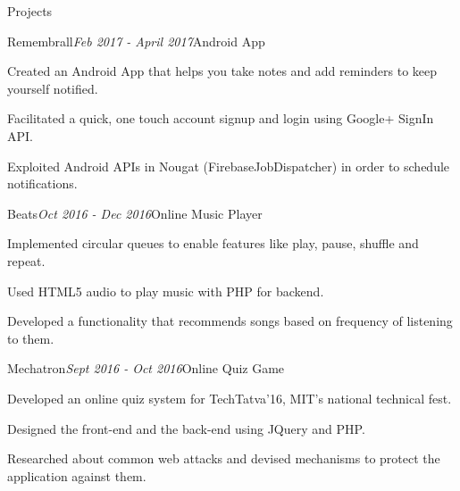 \documentclass{resume} %
\begin{document}
\begin{rSection}{Projects}
\begin{rSubsection}{Remembrall}{\em Feb 2017 - April 2017}{Android App}{}
  \item Created an Android App that helps you take notes and add reminders to keep yourself notified.
  \item Facilitated a quick, one touch account signup and login using Google+ SignIn API.
  \item Exploited Android APIs in Nougat (FirebaseJobDispatcher) in order to schedule notifications.
 \end{rSubsection}
 
\begin{rSubsection}{Beats}{\em Oct 2016 - Dec 2016}{Online Music Player}{}
  \item Implemented circular queues to enable features like play, pause, shuffle and repeat.
  \item Used HTML5 audio to play music with PHP for backend.
  \item Developed a functionality that recommends songs based on frequency of listening to them.
\end{rSubsection}
\begin{rSubsection}{Mechatron}{\em Sept 2016 - Oct 2016}{Online Quiz Game}{}
  \item Developed an online quiz system for TechTatva’16, MIT’s national technical fest.
  \item Designed the front-end and the back-end using JQuery and PHP. 
  \item Researched about common web attacks and devised mechanisms to protect the application against them.
\end{rSubsection}
\end{rSection}
\end{document}
